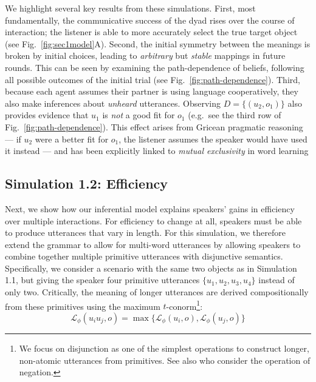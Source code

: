 We highlight several key results from these simulations.
First, most fundamentally, the communicative success of the dyad rises over the course of interaction; the listener is able to more accurately select the true target object (see Fig.~\ref{fig:sec1model}A). 
Second, the initial symmetry between the meanings is broken by initial choices, leading to \emph{arbitrary} but \emph{stable} mappings in future rounds.
This can be seen by examining the path-dependence of beliefs, following all possible outcomes of the initial trial (see Fig.~\ref{fig:path-dependence}). 
Third, because each agent assumes their partner is using language cooperatively, they also make inferences about \emph{unheard} utterances. 
Observing $D = \{(u_2, o_1)\}$ also provides evidence that $u_1$ is \emph{not} a good fit for $o_1$ (e.g.~see the third row of Fig.~\ref{fig:path-dependence}).
This effect arises from Gricean pragmatic reasoning --- if $u_2$ were a better fit for $o_1$, the listener assumes the speaker would have used it instead --- and has been explicitly linked to \emph{mutual exclusivity} in word learning \cite{bloom2002children,FrankGoodmanTenenbaum09_Wurwur,smith_learning_2013,gulordava2020one,ohmerreinforcement} 

\subsection{Simulation 1.2: Efficiency}

Next, we show how our inferential model explains speakers' gains in efficiency over multiple interactions. 
For efficiency to change at all, speakers must be able to produce utterances that vary in length. 
For this simulation, we therefore extend the grammar to allow for multi-word utterances by allowing speakers to combine together multiple primitive utterances with disjunctive semantics.
Specifically, we consider a scenario with the same two objects as in Simulation 1.1, but giving the speaker four primitive utterances $\{u_1, u_2, u_3, u_4\}$ instead of only two. 
Critically, the meaning of longer utterances are derived compositionally from these primitives using the maximum $t$-conorm\footnote{We focus on disjunction as one of the simplest operations to construct longer, non-atomic utterances from primitives. See also  who consider the operation of negation.}:
$$\mathcal{L}_\phi(u_iu_j, o) = \max\{\mathcal{L}_\phi(u_i, o) , \mathcal{L}_\phi(u_j, o)\}$$

